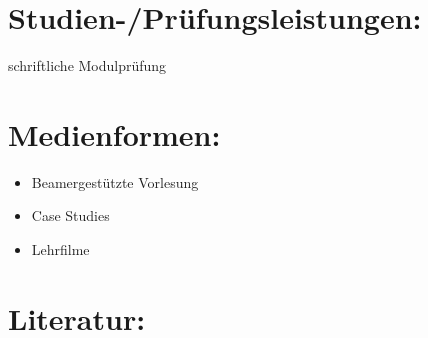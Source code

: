 \section*{Studien-/Prüfungsleistungen:}\label{studien-pruxfcfungsleistungen-13}

schriftliche Modulprüfung

\section*{Medienformen:}\label{medienformen-8}

\begin{itemize}
\tightlist
\item
  Beamergestützte Vorlesung
\item
  Case Studies
\item
  Lehrfilme
\end{itemize}

\section*{Literatur:}\label{literatur-12}

